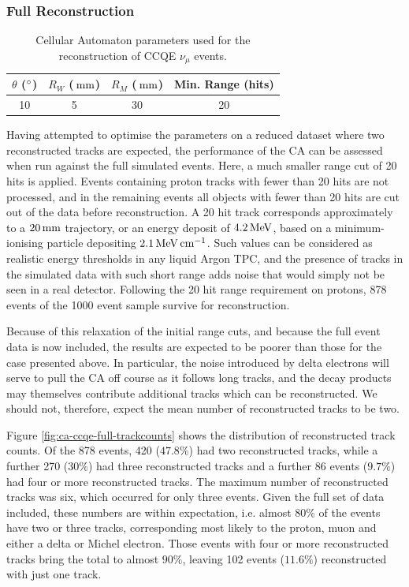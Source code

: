 \subsubsection{Full Reconstruction}
\begin{table}[h]
    \centering
    \begin{tabular}{cccc}
        $\theta$ ($^\circ$) & $R_W$ ($\,\mathrm{mm}$) & $R_M$ ($\,\mathrm{mm}$) & Min. Range (hits) \\
        \hline
        \hline
        10 & 5 & 30 & 20 \\
        \hline
    \end{tabular}
    \caption[CA parameter set for reconstruction of CCQE events]{\label{table:ca_params_ccqe}Cellular Automaton parameters used for the reconstruction of CCQE $\nu_\mu$ events.}
\end{table}

Having attempted to optimise the parameters on a reduced dataset where two reconstructed tracks are expected, the performance of the \ac{CA} can be assessed when run against the full simulated events. Here, a much smaller range cut of 20 hits is applied. Events containing proton tracks with fewer than 20 hits are not processed, and in the remaining events all objects with fewer than 20 hits are cut out of the data before reconstruction. A 20 hit track corresponds approximately to a $20\,\mathrm{mm}$ trajectory, or an energy deposit of $4.2\,\mathrm{MeV}$, based on a minimum-ionising particle depositing $2.1\,\mathrm{MeV} \,\mathrm{cm}^{-1}$. Such values can be considered as realistic energy thresholds in any liquid Argon TPC, and the presence of tracks in the simulated data with such short range adds noise that would simply not be seen in a real detector. Following the 20 hit range requirement on protons, 878 events of the 1000 event sample survive for reconstruction. 

Because of this relaxation of the initial range cuts, and because the full event data is now included, the results are expected to be poorer than those for the case presented above. In particular, the noise introduced by delta electrons will serve to pull the \ac{CA} off course as it follows long tracks, and the decay products may themselves contribute additional tracks which can be reconstructed. We should not, therefore, expect the mean number of reconstructed tracks to be two.

Figure \ref{fig:ca-ccqe-full-trackcounts} shows the distribution of reconstructed track counts. Of the 878 events, 420 ($47.8\%$) had two reconstructed tracks, while a further 270 ($30\%$) had three reconstructed tracks and a further 86 events ($9.7\%$) had four or more reconstructed tracks. The maximum number of reconstructed tracks was six, which occurred for only three events. Given the full set of data included, these numbers are within expectation, i.e. almost $80\%$ of the events have two or three tracks, corresponding most likely to the proton, muon and either a delta or Michel electron. Those events with four or more reconstructed tracks bring the total to almost $90\%$, leaving 102 events ($11.6\%$) reconstructed with just one track.

